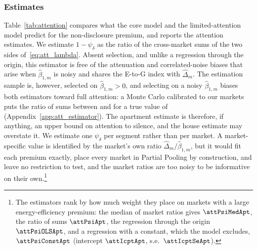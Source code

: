 \subsubsection{Estimates}
\label{ss:att_estimates}

Table~\ref{tab:attention} compares what the core model and the limited-attention model predict for the non-disclosure premium, and reports the attention estimates. We estimate $1-\psi_\delta$ as the ratio of the cross-market sums of the two sides of~\eqref{eq:att_lambda}. Absent selection, and unlike a regression through the origin, this estimator is free of the attenuation and correlated-noise biases that arise when $\hat\beta_{1,m}$ is noisy and shares the E-to-G index with $\hat\Delta_m$. The estimation sample is, however, selected on $\hat\beta_{1,m}>0$, and selecting on a noisy $\hat\beta_{1,m}$ biases both estimators toward full attention: a Monte Carlo calibrated to our markets puts the ratio of sums between \attMCromSelLo{} and \attMCromSelHi{} for a true value of \attMCtrue{} (Appendix~\ref{app:att_estimator}). The apartment estimate is therefore, if anything, an upper bound on attention to silence, and the house estimate may overstate it. We estimate one $\psi_\delta$ per segment rather than per market. A market-specific value is identified by the market's own ratio $\hat\Delta_m/\hat\beta_{1,m}$, but it would fit each premium exactly, place every market in Partial Pooling by construction, and leave no restriction to test, and the market ratios are too noisy to be informative on their own.\footnote{The estimators rank by how much weight they place on markets with a large energy-efficiency premium: the median of market ratios gives $\attPsiMedApt$, the ratio of sums $\attPsiApt$, the regression through the origin $\attPsiOLSApt$, and a regression with a constant, which the model excludes, $\attPsiConstApt$ (intercept $\attIcptApt$, s.e.\ $\attIcptSeApt$).}

